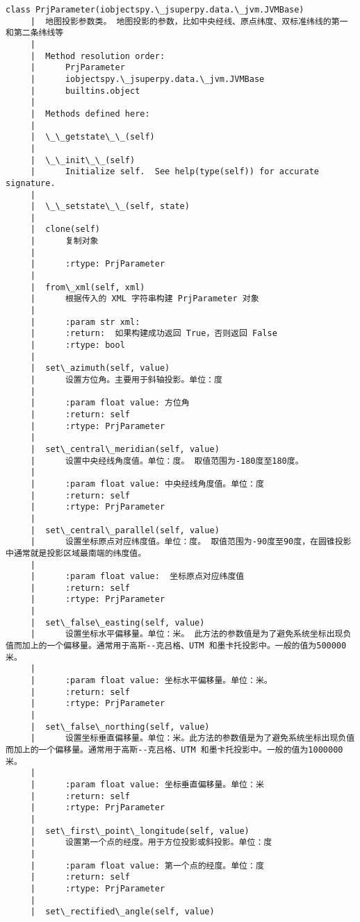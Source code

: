 \documentclass[11pt]{article}
\begin{document}
\begin{Verbatim}[commandchars=\\\{\}]
    class PrjParameter(iobjectspy.\_jsuperpy.data.\_jvm.JVMBase)
     |  地图投影参数类。 地图投影的参数，比如中央经线、原点纬度、双标准纬线的第一和第二条纬线等
     |  
     |  Method resolution order:
     |      PrjParameter
     |      iobjectspy.\_jsuperpy.data.\_jvm.JVMBase
     |      builtins.object
     |  
     |  Methods defined here:
     |  
     |  \_\_getstate\_\_(self)
     |  
     |  \_\_init\_\_(self)
     |      Initialize self.  See help(type(self)) for accurate signature.
     |  
     |  \_\_setstate\_\_(self, state)
     |  
     |  clone(self)
     |      复制对象
     |      
     |      :rtype: PrjParameter
     |  
     |  from\_xml(self, xml)
     |      根据传入的 XML 字符串构建 PrjParameter 对象
     |      
     |      :param str xml:
     |      :return:  如果构建成功返回 True，否则返回 False
     |      :rtype: bool
     |  
     |  set\_azimuth(self, value)
     |      设置方位角。主要用于斜轴投影。单位：度
     |      
     |      :param float value: 方位角
     |      :return: self
     |      :rtype: PrjParameter
     |  
     |  set\_central\_meridian(self, value)
     |      设置中央经线角度值。单位：度。 取值范围为-180度至180度。
     |      
     |      :param float value: 中央经线角度值。单位：度
     |      :return: self
     |      :rtype: PrjParameter
     |  
     |  set\_central\_parallel(self, value)
     |      设置坐标原点对应纬度值。单位：度。 取值范围为-90度至90度，在圆锥投影中通常就是投影区域最南端的纬度值。
     |      
     |      :param float value:  坐标原点对应纬度值
     |      :return: self
     |      :rtype: PrjParameter
     |  
     |  set\_false\_easting(self, value)
     |      设置坐标水平偏移量。单位：米。 此方法的参数值是为了避免系统坐标出现负值而加上的一个偏移量。通常用于高斯--克吕格、UTM 和墨卡托投影中。一般的值为500000米。
     |      
     |      :param float value: 坐标水平偏移量。单位：米。
     |      :return: self
     |      :rtype: PrjParameter
     |  
     |  set\_false\_northing(self, value)
     |      设置坐标垂直偏移量。单位：米。此方法的参数值是为了避免系统坐标出现负值而加上的一个偏移量。通常用于高斯--克吕格、UTM 和墨卡托投影中。一般的值为1000000米。
     |      
     |      :param float value: 坐标垂直偏移量。单位：米
     |      :return: self
     |      :rtype: PrjParameter
     |  
     |  set\_first\_point\_longitude(self, value)
     |      设置第一个点的经度。用于方位投影或斜投影。单位：度
     |      
     |      :param float value: 第一个点的经度。单位：度
     |      :return: self
     |      :rtype: PrjParameter
     |  
     |  set\_rectified\_angle(self, value)

\end{Verbatim}
\end{document}
